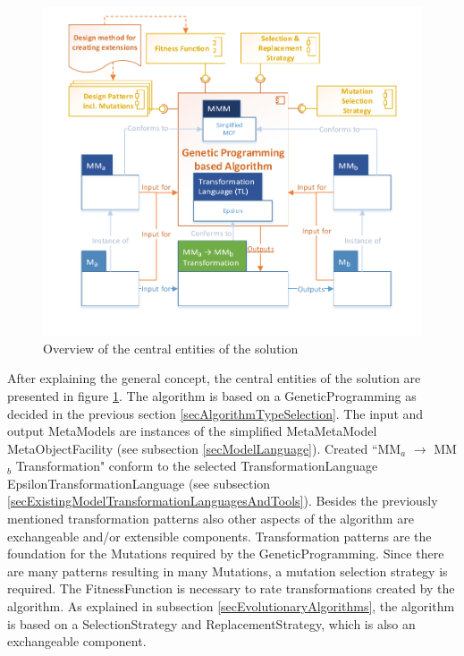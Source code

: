 \begin{figure}[ht!]
	\centering
	\includegraphics[scale=0.8, trim=0.5cm 1.2cm 0.5cm 0cm, clip=true]{Images/Solution.pdf}
	\caption{Overview of the central entities of the solution}
	\label{figSolution}
\end{figure}

After explaining the general concept, the central entities of the solution are presented in figure \ref{figSolution}. The algorithm is based on a \gls{GeneticProgramming} as decided in the previous section \ref{secAlgorithmTypeSelection}. The input and output \glspl{MetaModel} are instances of the simplified \gls{MetaMetaModel} \gls{MetaObjectFacility} (see subsection \ref{secModelLanguage}). Created ``MM$_a$ $\rightarrow$ MM$_b$ Transformation" conform to the selected \gls{TransformationLanguage} \gls{EpsilonTransformationLanguage} (see subsection \ref{secExistingModelTransformationLanguagesAndTools}). Besides the previously mentioned transformation patterns also other aspects of the algorithm are exchangeable and/or extensible components. Transformation patterns are the foundation for the \glspl{Mutation} required by the \gls{GeneticProgramming}. Since there are many patterns resulting in many \glspl{Mutation}, a mutation selection strategy is required. The \gls{FitnessFunction} is necessary to rate transformations created by the algorithm. As explained in subsection \ref{secEvolutionaryAlgorithms}, the algorithm is based on a \gls{SelectionStrategy} and \gls{ReplacementStrategy}, which is also an exchangeable component.

